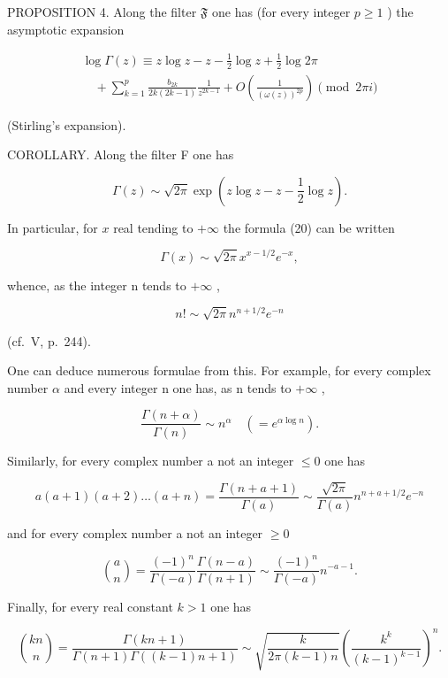 PROPOSITION 4. Along the filter \(\mathfrak{F}\) one has (for every integer \(p \geqslant 1\) ) the asymptotic expansion

\[
\begin{array}{l} \log \Gamma (z) \equiv z \log z - z - \frac {1}{2} \log z + \frac {1}{2} \log 2 \pi \\ \quad + \sum_ {k = 1} ^ {p} \frac {b _ {2 k}}{2 k (2 k - 1)} \frac {1}{z ^ {2 k - 1}} + O \left(\frac {1}{(\omega (z)) ^ {2 p}}\right) \pmod {2 \pi i} \end{array}\tag{19}
\]

(Stirling's expansion).

COROLLARY. Along the filter F one has

\[
\Gamma (z) \sim \sqrt {2 \pi} \exp (z \log z - z - \frac {1}{2} \log z).\tag{20}
\]

In particular, for \(x\) real tending to \(+\infty\) the formula (20) can be written

\[
\Gamma (x) \sim \sqrt {2 \pi} x ^ {x - 1 / 2} e ^ {- x},\tag{21}
\]

whence, as the integer n tends to \(+\infty\) ,

\[
n! \sim \sqrt {2 \pi} n ^ {n + 1 / 2} e ^ {- n}
\]

(cf.~V, p.~244).

One can deduce numerous formulae from this. For example, for every complex number \(\alpha\) and every integer n one has, as n tends to \(+\infty\) ,

\[
\frac {\Gamma (n + \alpha)}{\Gamma (n)} \sim n ^ {\alpha} \quad (= e ^ {\alpha \log n}).\tag{22}
\]

Similarly, for every complex number a not an integer \(\leqslant 0\) one has

\[
a (a + 1) (a + 2) \dots (a + n) = \frac {\Gamma (n + a + 1)}{\Gamma (a)} \sim \frac {\sqrt {2 \pi}}{\Gamma (a)} n ^ {n + a + 1 / 2} e ^ {- n}\tag{23}
\]

and for every complex number a not an integer \(\geqslant 0\)

\[
\binom {a} {n} = \frac {(- 1) ^ {n}}{\Gamma (- a)}   \frac {\Gamma (n - a)}{\Gamma (n + 1)} \sim \frac {(- 1) ^ {n}}{\Gamma (- a)}   n ^ {- a - 1}.\tag{24}
\]

Finally, for every real constant \(k > 1\) one has

\[
\binom {k n} {n} = \frac {\Gamma (k n + 1)}{\Gamma (n + 1)   \Gamma ((k - 1) n + 1)} \sim \sqrt {\frac {k}{2 \pi (k - 1) n}} \left(\frac {k ^ {k}}{(k - 1) ^ {k - 1}}\right) ^ {n}.\tag{25}
\]

